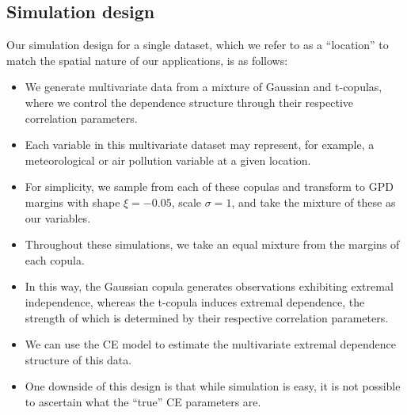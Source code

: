 \documentclass{article}
\numberwithin{equation}{section}
\begin{document}
\subsection{Simulation design} \label{subsec:sim_design}


Our simulation design for a single dataset, which we refer to as a ``location'' to match the spatial nature of our applications, is as follows:
\begin{itemize}
  \item We generate multivariate data from a mixture of Gaussian and t-copulas, where we control the dependence structure through their respective correlation parameters. 
  \item Each variable in this multivariate dataset may represent, for example, a meteorological or air pollution variable at a given location.
  \item For simplicity, we sample from each of these copulas and transform to GPD margins with shape $\xi = -0.05$, scale $\sigma = 1$, and take the mixture of these as our variables.  
  \item Throughout these simulations, we take an equal mixture from the margins of each copula. 
  \item In this way, the Gaussian copula generates observations exhibiting extremal independence, whereas the t-copula induces extremal dependence, the strength of which is determined by their respective correlation parameters.
  \item We can use the CE model to estimate the multivariate extremal dependence structure of this data.
  \item One downside of this design is that while simulation is easy, it is not possible to ascertain what the ``true'' CE parameters are. 
\end{itemize}
\end{document}
